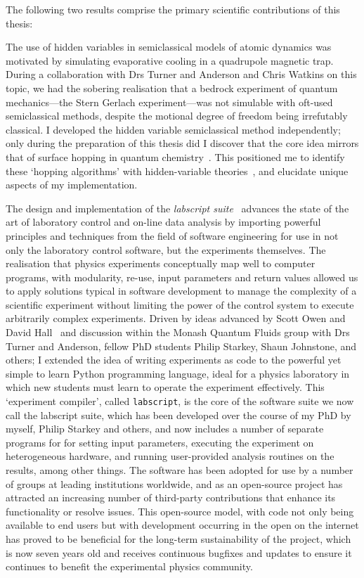 The following two results comprise the primary scientific contributions of this thesis:

The use of hidden variables in semiclassical models of atomic dynamics was motivated by simulating evaporative cooling in a quadrupole magnetic trap. During a collaboration with Drs Turner and Anderson and Chris Watkins on this topic, we had the sobering realisation that a bedrock experiment of quantum mechanics---the Stern Gerlach experiment---was not simulable with oft-used semiclassical methods, despite the motional degree of freedom being irrefutably classical. I developed the hidden variable semiclassical method independently; only during the preparation of this thesis did I discover that the core idea mirrors that of surface hopping in quantum chemistry~\cite{doi:10.1063/1.459170}. This positioned me to identify these `hopping algorithms' with hidden-variable theories~\cite{PhysRevA.71.032325}, and elucidate unique aspects of my implementation.

The design and implementation of the \emph{labscript suite}~\cite{starkey_scripted_2013} advances the state of the art of laboratory control and on-line data analysis by importing powerful principles and techniques from the field of software engineering for use in not only the laboratory control software, but the experiments themselves. The realisation that physics experiments conceptually map well to computer programs, with modularity, re-use, input parameters and return values allowed us to apply solutions typical in software development to manage the complexity of a scientific experiment without limiting the power of the control system to execute arbitrarily complex experiments. Driven by ideas advanced by Scott Owen and David Hall~\cite{owen_fast_2003} and discussion within the Monash Quantum Fluids group with Drs Turner and Anderson, fellow PhD students Philip Starkey, Shaun Johnstone, and others; I extended the idea of writing experiments as code to the powerful yet simple to learn Python programming language, ideal for a physics laboratory in which new students must learn to operate the experiment effectively. This `experiment compiler', called \texttt{labscript}, is the core of the software suite we now call the labscript suite, which has been developed over the course of my PhD by myself, Philip Starkey and others, and now includes a number of separate programs for for setting input parameters, executing the experiment on heterogeneous hardware, and running user-provided analysis routines on the results, among other things. The software has been adopted for use by a number of groups at leading institutions worldwide, and as an open-source project has attracted an increasing number of third-party contributions that enhance its functionality or resolve issues. This open-source model, with code not only being available to end users but with development occurring in the open on the internet has proved to be beneficial for the long-term sustainability of the project, which is now seven years old and receives continuous bugfixes and updates to ensure it continues to benefit the experimental physics community.

